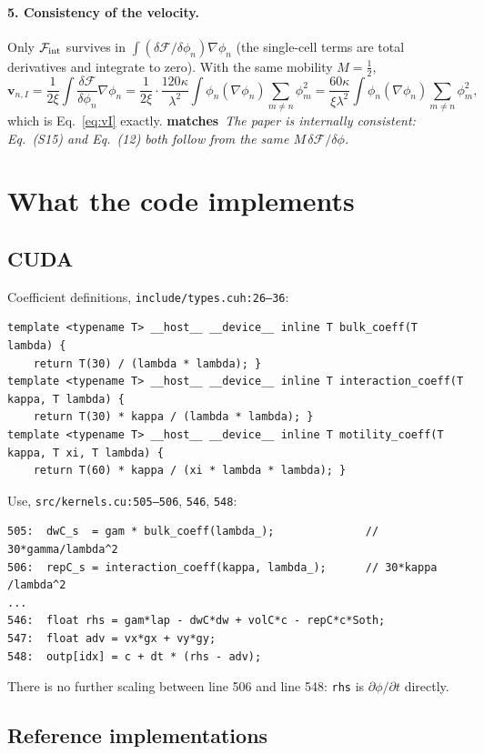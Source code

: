\documentclass[11pt]{article}
\newcommand{\pn}{\phi_n}
\newcommand{\OK}{{\color{blue}\textbf{matches}}}
\begin{document}
\paragraph{5. Consistency of the velocity.}
Only $\mathcal{F}_{\rm int}$ survives in $\int(\delta\mathcal{F}/\delta\pn)\nabla\pn$
(the single-cell terms are total derivatives and integrate to zero). With the
same mobility $M=\tfrac12$,
\[
\mathbf{v}_{n,I} = \frac{1}{2\xi}\int\frac{\delta\mathcal{F}}{\delta\pn}\nabla\pn
 = \frac{1}{2\xi}\cdot\frac{120\kappa}{\lambda^2}\int\pn(\nabla\pn)\!\!\sum_{m\neq n}\!\phi_m^2
 = \frac{60\kappa}{\xi\lambda^2}\int\pn(\nabla\pn)\!\!\sum_{m\neq n}\!\phi_m^2 ,
\]
which is Eq.~\eqref{eq:vI} exactly. \OK\ \emph{The paper is internally
consistent: Eq.~(S15) and Eq.~(12) both follow from the same
$M\,\delta\mathcal{F}/\delta\phi$.}

\section{What the code implements}

\subsection{CUDA}

Coefficient definitions, \texttt{include/types.cuh:26--36}:
\begin{lstlisting}
template <typename T> __host__ __device__ inline T bulk_coeff(T lambda) {
    return T(30) / (lambda * lambda); }
template <typename T> __host__ __device__ inline T interaction_coeff(T kappa, T lambda) {
    return T(30) * kappa / (lambda * lambda); }
template <typename T> __host__ __device__ inline T motility_coeff(T kappa, T xi, T lambda) {
    return T(60) * kappa / (xi * lambda * lambda); }
\end{lstlisting}

Use, \texttt{src/kernels.cu:505--506}, \texttt{546}, \texttt{548}:
\begin{lstlisting}
505:  dwC_s  = gam * bulk_coeff(lambda_);              // 30*gamma/lambda^2
506:  repC_s = interaction_coeff(kappa, lambda_);      // 30*kappa /lambda^2
...
546:  float rhs = gam*lap - dwC*dw + volC*c - repC*c*Soth;
547:  float adv = vx*gx + vy*gy;
548:  outp[idx] = c + dt * (rhs - adv);
\end{lstlisting}
There is no further scaling between line 506 and line 548: \texttt{rhs} is
$\partial\phi/\partial t$ directly.

\subsection{Reference implementations}
\end{document}
